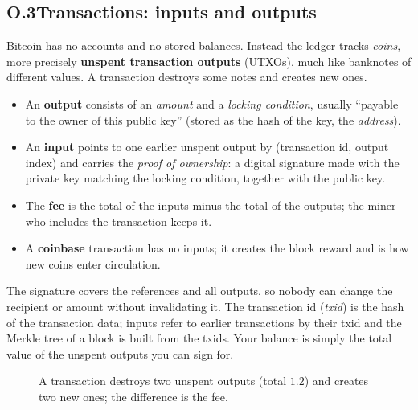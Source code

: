 \documentclass[11pt,a4paper]{article}
\theoremstyle{definition}
\theoremstyle{plain}
\theoremstyle{remark}
\newcommand{\Hash}{\mathsf{H}}
\begin{document}
\subsection*{O.3\quad Transactions: inputs and outputs}
Bitcoin has no accounts and no stored balances. Instead the ledger tracks \emph{coins}, more precisely \textbf{unspent transaction outputs} (UTXOs), much like banknotes of different values. A transaction destroys some notes and creates new ones.
\begin{itemize}[nosep,leftmargin=1.2em]
\item An \textbf{output} consists of an \emph{amount} and a \emph{locking condition}, usually ``payable to the owner of this public key'' (stored as the hash of the key, the \emph{address}).
\item An \textbf{input} points to one earlier unspent output by (transaction id, output index) and carries the \emph{proof of ownership}: a digital signature made with the private key matching the locking condition, together with the public key.
\item The \textbf{fee} is the total of the inputs minus the total of the outputs; the miner who includes the transaction keeps it.
\item A \textbf{coinbase} transaction has no inputs; it creates the block reward and is how new coins enter circulation.
\end{itemize}
The signature covers the references and all outputs, so nobody can change the recipient or amount without invalidating it. The transaction id (\emph{txid}) is the hash of the transaction data; inputs refer to earlier transactions by their txid and the Merkle tree of a block is built from the txids. Your balance is simply the total value of the unspent outputs you can sign for.

\begin{figure}[htbp]
\centering
{}
\caption{A transaction destroys two unspent outputs (total $1.2$) and creates two new ones; the difference is the fee.}
\end{figure}
\end{document}
